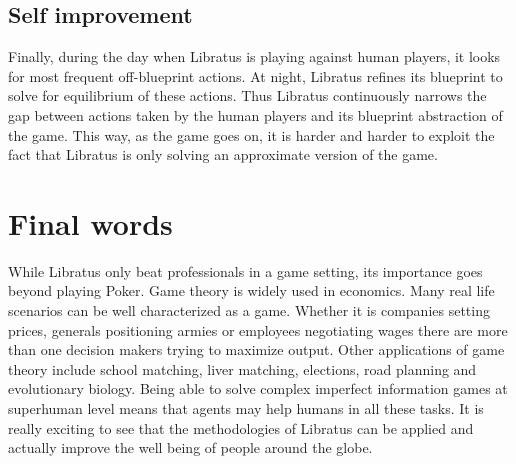 \documentclass[10pt,a4paper]{article}
\begin{document}
\subsection{Self improvement}
Finally, during the day when Libratus is playing against human players, it looks for most frequent off-blueprint actions. At night, Libratus refines its blueprint to solve for equilibrium of these actions. Thus Libratus continuously narrows the gap between actions taken by the human players and its blueprint abstraction of the game. This way, as the game goes on, it is harder and harder to exploit the fact that Libratus is only solving an approximate version of the game.

\section{Final words}
While Libratus only beat professionals in a game setting, its importance goes beyond playing Poker. Game theory is widely used in economics. Many real life scenarios can be well characterized as a game. Whether it is companies setting prices, generals positioning armies or employees negotiating wages there are more than one decision makers trying to maximize output. Other applications of game theory include school matching, liver matching, elections, road planning and evolutionary biology. Being able to solve complex imperfect information games at superhuman level means that agents may help humans in all these tasks. It is really exciting to see that the methodologies of Libratus can be applied and actually improve the well being of people around the globe.


\newpage


\end{document}
